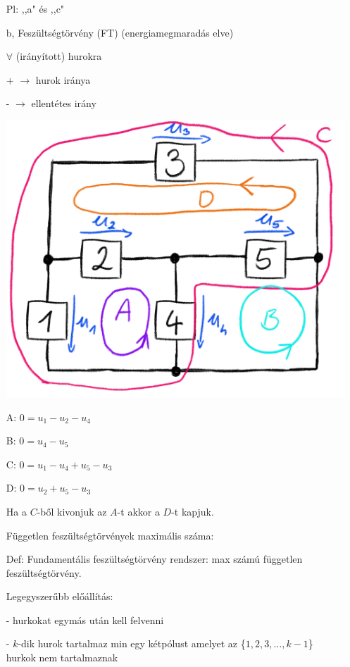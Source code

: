 \documentclass[12pt]{article}
\begin{document}
\begin{itemize}
                    Pl: ,,a" és ,,c" 

                \item[b,] Feszültségtörvény (FT) (energiamegmaradás elve)
                
                    $\forall$ (irányított) hurokra 

                    + $\rightarrow$ hurok iránya

                    - $\rightarrow$ ellentétes irány

                    \includegraphics{img/9.png}

                    A: $0 = u_1-u_2-u_4$

                    B: $0 = u_4-u_5$

                    C: $0 = u_1-u_4+u_5-u_3$

                    D: $0 = u_2+u_5-u_3$

                    Ha a $C$-ből kivonjuk az $A$-t akkor a $D$-t kapjuk.

                    Független feszültségtörvények maximális száma: 

                    Def: Fundamentális feszültségtörvény rendszer: max számú független feszültségtörvény.

                    Legegyszerűbb előállítás:

                    - hurkokat egymás után kell felvenni 

                    - $k$-dik hurok tartalmaz min egy kétpólust amelyet az \{$1, 2, 3, \dots, k-1$\} hurkok nem tartalmaznak


\end{itemize}
\end{document}
